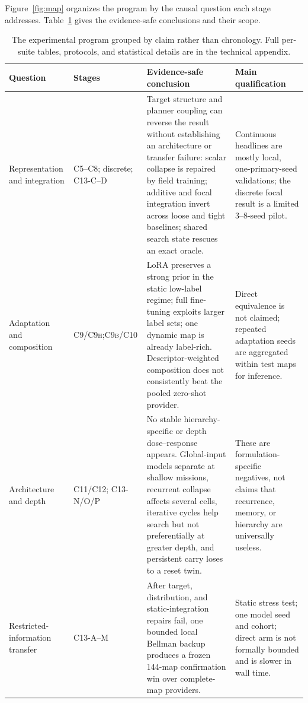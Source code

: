 \documentclass[letterpaper]{article} %
\newcommand{\stage}[1]{\textsc{#1}}
\begin{document}
Figure~\ref{fig:map} organizes the program by the causal question each stage addresses. Table~\ref{tab:matrix} gives the evidence-safe conclusions and their scope.

\begin{table}[t]
\centering
\footnotesize
\begin{tabular}{@{}p{2.3cm}p{2.0cm}p{7.3cm}p{4.2cm}@{}}
\toprule
Question & Stages & Evidence-safe conclusion & Main qualification \\
\midrule
Representation and integration & \stage{C5--C8}; discrete; \stage{C13-C--D} & Target structure and planner coupling can reverse the result without establishing an architecture or transfer failure: scalar collapse is repaired by field training; additive and focal integration invert across loose and tight baselines; shared search state rescues an exact oracle. & Continuous headlines are mostly local, one-primary-seed validations; the discrete focal result is a limited 3--8-seed pilot. \\
Adaptation and composition & \stage{C9/C9h};\newline\stage{C9b/C10} & LoRA preserves a strong prior in the static low-label regime; full fine-tuning exploits larger label sets; one dynamic map is already label-rich. Descriptor-weighted composition does not consistently beat the pooled zero-shot provider. & Direct equivalence is not claimed; repeated adaptation seeds are aggregated within test maps for inference. \\
Architecture and depth & \stage{C11/C12}; \stage{C13-N/O/P} & No stable hierarchy-specific or depth dose--response appears. Global-input models separate at shallow missions, recurrent collapse affects several cells, iterative cycles help search but not preferentially at greater depth, and persistent carry loses to a reset twin. & These are formulation-specific negatives, not claims that recurrence, memory, or hierarchy are universally useless. \\
Restricted-information transfer & \stage{C13-A--M} & After target, distribution, and static-integration repairs fail, one bounded local Bellman backup produces a frozen 144-map confirmation win over complete-map providers. & Static stress test; one model seed and cohort; direct arm is not formally bounded and is slower in wall time. \\
\bottomrule
\end{tabular}
\caption{The experimental program grouped by claim rather than chronology. Full per-suite tables, protocols, and statistical details are in the technical appendix.}
\label{tab:matrix}
\end{table}
\end{document}
